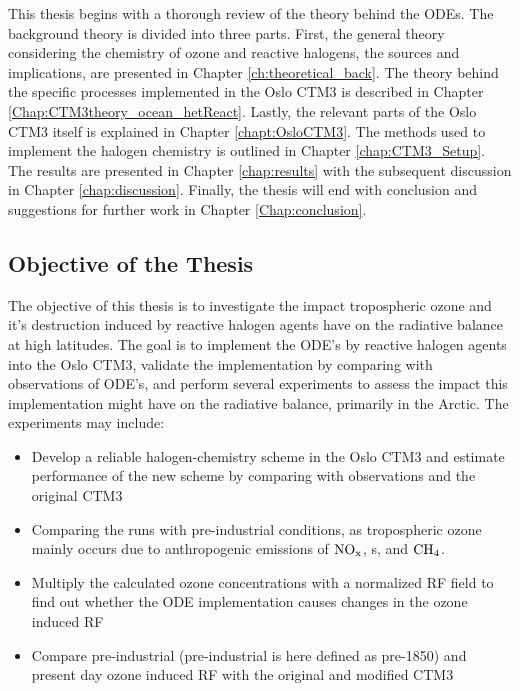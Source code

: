 This thesis begins with a thorough review of the theory behind the ODEs. The background theory is divided into three parts. First, the general theory considering the chemistry of ozone and reactive halogens, the sources and implications, are presented in Chapter \ref{ch:theoretical_back}. The theory behind the specific processes implemented in the Oslo CTM3 is described in Chapter \ref{Chap:CTM3theory_ocean_hetReact}. Lastly, the relevant parts of the Oslo CTM3 itself is explained in Chapter \ref{chapt:OsloCTM3}. The methods used to implement the halogen chemistry is outlined in Chapter \ref{chap:CTM3_Setup}. The results are presented in Chapter \ref{chap:results} with the subsequent discussion in Chapter \ref{chap:discussion}. Finally, the thesis will end with conclusion and suggestions for further work in Chapter \ref{Chap:conclusion}. 


\subsection{Objective of the Thesis}

The objective of this thesis is to investigate the impact tropospheric ozone and it's destruction induced by reactive halogen agents have on the radiative balance at high latitudes. The goal is to implement the ODE's by reactive halogen agents into the Oslo CTM3, validate the implementation by comparing with observations of ODE's, and perform several experiments to assess the  impact this implementation might have on the radiative balance, primarily in the Arctic. The experiments may include: 

\begin{itemize}
    \item Develop a reliable halogen-chemistry scheme in the Oslo CTM3 and estimate performance of the new scheme by comparing with observations and the original CTM3
    \item Comparing the runs with pre-industrial conditions, as tropospheric ozone mainly occurs due to anthropogenic emissions of $\mathrm{NO_x}$, s,  and $\mathrm{CH_4}$.
    \item Multiply the calculated ozone concentrations with a normalized RF field to find out whether the ODE implementation causes changes in the ozone induced RF
    \item Compare pre-industrial (pre-industrial is here defined as pre-1850) and present day ozone induced RF with the original and modified CTM3
\end{itemize}

